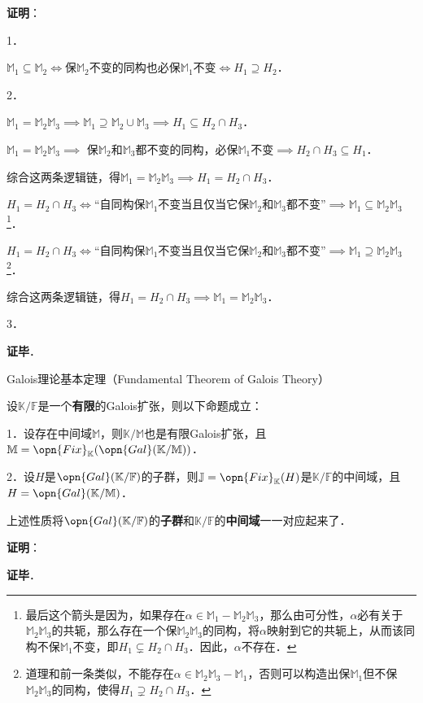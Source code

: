 \textbf{证明}：

1．

$\mathbb{M}_1\subseteq\mathbb{M}_2 \iff$保$\mathbb{M}_2$不变的同构也必保$\mathbb{M}_1$不变$\iff H_1\supseteq H_2$．

2．

$\mathbb{M}_1=\mathbb{M}_2\mathbb{M}_3\implies \mathbb{M}_1\supseteq\mathbb{M}_2\cup\mathbb{M}_3\implies H_1\subseteq H_2\cap H_3$．

$\mathbb{M}_1=\mathbb{M}_2\mathbb{M}_3\implies$ 保$\mathbb{M}_2$和$\mathbb{M}_3$都不变的同构，必保$\mathbb{M}_1$不变$\implies H_2\cap H_3\subseteq H_1$．

综合这两条逻辑链，得$\mathbb{M}_1=\mathbb{M}_2\mathbb{M}_3 \implies H_1=H_2\cap H_3$．

$H_1=H_2\cap H_3\iff$“自同构保$\mathbb{M}_1$不变当且仅当它保$\mathbb{M}_2$和$\mathbb{M}_3$都不变”$\implies \mathbb{M}_1\subseteq\mathbb{M}_2\mathbb{M}_3$\footnote{最后这个箭头是因为，如果存在$\alpha\in\mathbb{M}_1-\mathbb{M}_2\mathbb{M}_3$，那么由可分性，$\alpha$必有关于$\mathbb{M}_2\mathbb{M}_3$的共轭，那么存在一个保$\mathbb{M}_2\mathbb{M}_3$的同构，将$\alpha$映射到它的共轭上，从而该同构不保$\mathbb{M}_1$不变，即$H_1\subsetneq H_2\cap H_3$．因此，$\alpha$不存在．}．

$H_1=H_2\cap H_3\iff$“自同构保$\mathbb{M}_1$不变当且仅当它保$\mathbb{M}_2$和$\mathbb{M}_3$都不变”$\implies \mathbb{M}_1\supseteq\mathbb{M}_2\mathbb{M}_3$\footnote{道理和前一条类似，不能存在$\alpha\in\mathbb{M}_2\mathbb{M}_3-\mathbb{M}_1$，否则可以构造出保$\mathbb{M}_1$但不保$\mathbb{M}_2\mathbb{M}_3$的同构，使得$H_1\supsetneq H_2\cap H_3$．}．

综合这两条逻辑链，得$H_1=H_2\cap H_3 \implies \mathbb{M}_1=\mathbb{M}_2\mathbb{M}_3$．


3．




\textbf{证毕}．














\begin{theorem}{Galois理论基本定理（Fundamental Theorem of Galois Theory）}

设$\mathbb{K}/\mathbb{F}$是一个\textbf{有限}的Galois扩张，则以下命题成立：

1．设存在中间域$\mathbb{M}$，则$\mathbb{K}/\mathbb{M}$也是有限Galois扩张，且$\mathbb{M}=\opn{Fix}_\mathbb{K}(\opn{Gal}(\mathbb{K}/\mathbb{M}))$．

2．设$H$是$\opn{Gal}(\mathbb{K}/\mathbb{F})$的子群，则$\mathbb{J}=\opn{Fix}_\mathbb{K}(H)$是$\mathbb{K}/\mathbb{F}$的中间域，且$H=\opn{Gal}(\mathbb{K}/\mathbb{M})$．

上述性质将$\opn{Gal}(\mathbb{K}/\mathbb{F})$的\textbf{子群}和$\mathbb{K}/\mathbb{F}$的\textbf{中间域}一一对应起来了．

\end{theorem}

\textbf{证明}：



\textbf{证毕}．


















